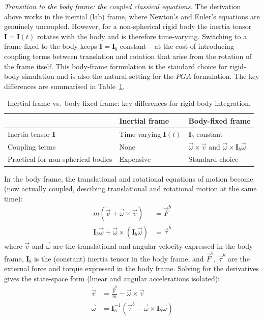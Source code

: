 \emph{Transition to the body frame: the coupled classical equations.}
The derivation above works in the inertial (lab) frame, where Newton's and Euler's
equations are genuinely uncoupled. However, for a non-spherical rigid body the inertia
tensor $\mathbf{I} = \mathbf{I}(t)$ rotates with the body and is therefore time-varying.
Switching to a frame fixed to the body keeps $\mathbf{I} = \mathbf{I}_b$ constant -- at
the cost of introducing coupling terms between translation and rotation that arise from
the rotation of the frame itself. This body-frame formulation is the standard choice for
rigid-body simulation and is also the natural setting for the $PGA$ formulation. The key
differences are summarised in Table~\ref{tab:inertial_vs_body}.

\begin{table}[h!]
\centering\small
\begin{tabular}{p{3cm}|p{4cm}|p{4cm}}
\hline
 & Inertial frame & Body-fixed frame \\
\hline
Inertia tensor $\mathbf{I}$ & Time-varying $\mathbf{I}(t)$ & $\mathbf{I}_b$ constant \\
Coupling terms & None & $\vec{\omega}\times\vec{v}$ and
$\vec{\omega}\times\mathbf{I}_b\vec{\omega}$ \\
Practical for non-spherical bodies & Expensive & Standard choice \\
\hline
\end{tabular}
\caption{Inertial frame vs.\ body-fixed frame: key differences for rigid-body integration.}
\label{tab:inertial_vs_body}
\end{table}

In the body frame, the translational and rotational equations of motion become (now
actually coupled, descibing translational and rotational motion at the same time):
\begin{align}
    m\left(\dot{\vec{v}} + \vec{\omega}\times\vec{v}\right) &= \vec{F}^b
    \label{eq:newton_body_frame} \\
    \mathbf{I}_b\dot{\vec{\omega}}
    + \vec{\omega}\times\left(\mathbf{I}_b\vec{\omega}\right) &= \vec{\tau}^b
    \label{eq:euler_body_frame}
\end{align}
where $\vec{v}$ and $\vec{\omega}$ are the translational and angular velocity expressed in
the body frame, $\mathbf{I}_b$ is the (constant) inertia tensor in the body frame, and
$\vec{F}^b$, $\vec{\tau}^b$ are the external force and torque expressed in the body frame.
Solving for the derivatives gives the state-space form (linear and angular accelerations
isolated):
\begin{align}
    \dot{\vec{v}} &= \frac{\vec{F}^b}{m} - \vec{\omega}\times\vec{v}
    \label{eq:newton_body_frame_ss} \\
    \dot{\vec{\omega}} &= \mathbf{I}_b^{-1}\!\left(\vec{\tau}^b
    - \vec{\omega}\times\mathbf{I}_b\vec{\omega}\right)
    \label{eq:euler_body_frame_ss}
\end{align}

